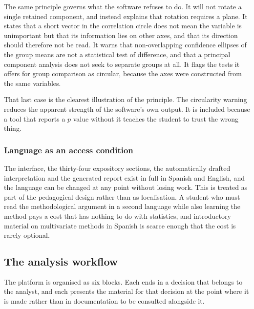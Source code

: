 \documentclass[12pt]{article}
\begin{document}
The same principle governs what the software refuses to do. It will not rotate a
single retained component, and instead explains that rotation requires a plane.
It states that a short vector in the correlation circle does not mean the
variable is unimportant but that its information lies on other axes, and that
its direction should therefore not be read. It warns that non-overlapping
confidence ellipses of the group means are not a statistical test of difference,
and that a principal component analysis does not seek to separate groups at all.
It flags the tests it offers for group comparison as circular, because the axes
were constructed from the same variables.

That last case is the clearest illustration of the principle. The circularity
warning reduces the apparent strength of the software's own output. It is
included because a tool that reports a $p$ value without it teaches the student
to trust the wrong thing.

\subsubsection{Language as an access condition}

The interface, the thirty-four expository sections, the automatically drafted
interpretation and the generated report exist in full in Spanish and English,
and the language can be changed at any point without losing work. This is
treated as part of the pedagogical design rather than as localisation. A student
who must read the methodological argument in a second language while also
learning the method pays a cost that has nothing to do with statistics, and
introductory material on multivariate methods in Spanish is scarce enough that
the cost is rarely optional.


\subsection{The analysis workflow}

The platform is organised as six blocks. Each ends in a decision that belongs to
the analyst, and each presents the material for that decision at the point where
it is made rather than in documentation to be consulted alongside it.
\end{document}
